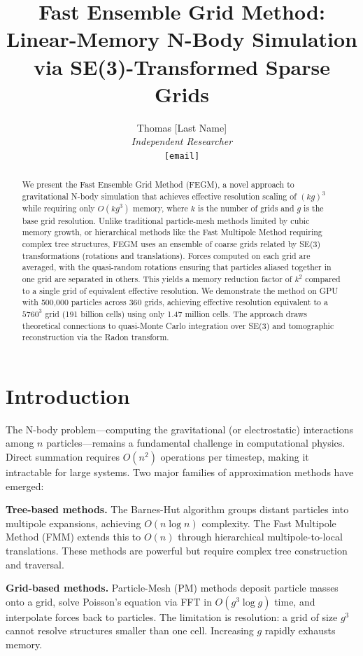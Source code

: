 \documentclass[11pt,twocolumn]{article}
\title{Fast Ensemble Grid Method: Linear-Memory N-Body Simulation via SE(3)-Transformed Sparse Grids}
\author{Thomas [Last Name]\\
\textit{Independent Researcher}\\
\texttt{[email]}}
\date{}
\begin{document}
\maketitle

\begin{abstract}
We present the Fast Ensemble Grid Method (FEGM), a novel approach to gravitational N-body simulation that achieves effective resolution scaling of $(kg)^3$ while requiring only $O(kg^3)$ memory, where $k$ is the number of grids and $g$ is the base grid resolution. Unlike traditional particle-mesh methods limited by cubic memory growth, or hierarchical methods like the Fast Multipole Method requiring complex tree structures, FEGM uses an ensemble of coarse grids related by SE(3) transformations (rotations and translations). Forces computed on each grid are averaged, with the quasi-random rotations ensuring that particles aliased together in one grid are separated in others. This yields a memory reduction factor of $k^2$ compared to a single grid of equivalent effective resolution. We demonstrate the method on GPU with 500,000 particles across 360 grids, achieving effective resolution equivalent to a $5760^3$ grid (191 billion cells) using only 1.47 million cells. The approach draws theoretical connections to quasi-Monte Carlo integration over SE(3) and tomographic reconstruction via the Radon transform.
\end{abstract}

\section{Introduction}

The N-body problem---computing the gravitational (or electrostatic) interactions among $n$ particles---remains a fundamental challenge in computational physics. Direct summation requires $O(n^2)$ operations per timestep, making it intractable for large systems. Two major families of approximation methods have emerged:

\textbf{Tree-based methods.} The Barnes-Hut algorithm \cite{barnes1986} groups distant particles into multipole expansions, achieving $O(n \log n)$ complexity. The Fast Multipole Method (FMM) \cite{greengard1987} extends this to $O(n)$ through hierarchical multipole-to-local translations. These methods are powerful but require complex tree construction and traversal.

\textbf{Grid-based methods.} Particle-Mesh (PM) methods \cite{hockney1988} deposit particle masses onto a grid, solve Poisson's equation via FFT in $O(g^3 \log g)$ time, and interpolate forces back to particles. The limitation is resolution: a grid of size $g^3$ cannot resolve structures smaller than one cell. Increasing $g$ rapidly exhausts memory.
\end{document}
